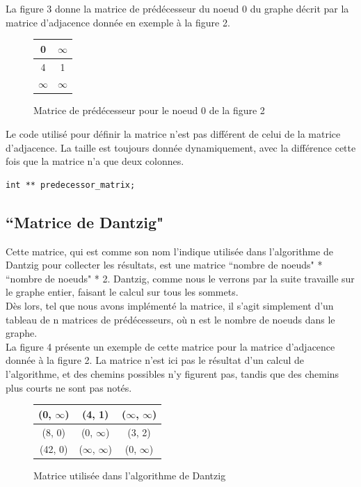 \documentclass[a4paper,12pt,final] {article}
\begin{document}
La figure 3 donne la matrice de prédécesseur du noeud 0 du graphe décrit par la matrice d'adjacence donnée en exemple à la figure 2.\\ %

\begin{figure}[htdp]
\begin{center}
\begin{tabular}{|c|c|}
\hline
0 &$\infty$\\
\hline
4 & 1 \\
\hline
$\infty$ & $\infty$ \\
\hline
\end{tabular}
\end{center}
\caption{Matrice de prédécesseur pour le noeud 0 de la figure 2}
\end{figure}%

Le code utilisé pour définir la matrice n'est pas différent de celui de la matrice d'adjacence. La taille est toujours donnée dynamiquement, avec la différence cette fois que la matrice n'a que deux colonnes.
\begin{lstlisting}
int ** predecessor_matrix;
\end{lstlisting}

\subsection{``Matrice de Dantzig"}

Cette matrice, qui est comme son nom l'indique utilisée dans l'algorithme de Dantzig pour collecter les résultats, est une matrice ``nombre de noeuds" * ``nombre de noeuds" * 2. Dantzig, comme nous le verrons par la suite travaille sur le graphe entier, faisant  le calcul sur tous les sommets.\\

Dès lors, tel que nous avons implémenté la matrice, il s'agit simplement d'un tableau de n matrices de prédécesseurs, où n est le nombre de noeuds dans le graphe.\\

La figure 4 présente un exemple de cette matrice pour la matrice d'adjacence donnée à la figure 2. La matrice n'est ici pas le résultat d'un calcul de l'algorithme, et des chemins possibles n'y figurent pas, tandis que des chemins plus courts ne sont pas notés.\\ %

\begin{figure}[htdp]
\begin{center}
\begin{tabular}{|c|c|c|}
\hline
(0, $\infty$) & (4, 1) & ($\infty$, $\infty$) \\
\hline
(8, 0) & (0, $\infty$) & (3, 2)\\
\hline
(42, 0) & ($\infty$, $\infty$) & (0, $\infty$)\\ 
\hline
\end{tabular}
\end{center}
\caption{Matrice utilisée dans l'algorithme de Dantzig}
\end{figure}
\end{document}
